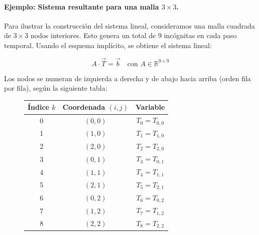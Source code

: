 \documentclass{article}
\begin{document}
\paragraph{Ejemplo: Sistema resultante para una malla $3 \times 3$.} Para ilustrar la construcción del sistema lineal, consideramos una malla cuadrada de $3 \times 3$ nodos interiores. Esto genera un total de $9$ incógnitas en cada paso temporal. Usando el esquema implícito, se obtiene el sistema lineal:

$$
A \cdot \vec{T} = \vec{b} \quad \text{con } A \in \mathbb{R}^{9 \times 9} 
$$

Los nodos se numeran de izquierda a derecha y de abajo hacia arriba (orden fila por fila), según la siguiente tabla:

\begin{figure}[H]
\centering
\begin{minipage}[c]{0.45\textwidth}
\centering
\begin{tabular}{|c|c|c|}
\hline
Índice $k$ & Coordenada $(i,j)$ & Variable \\
\hline
0 & $(0,0)$ & $T_0 = T_{0,0}$ \\
1 & $(1,0)$ & $T_1 = T_{1,0}$ \\
2 & $(2,0)$ & $T_2 = T_{2,0}$ \\
3 & $(0,1)$ & $T_3 = T_{0,1}$ \\
4 & $(1,1)$ & $T_4 = T_{1,1}$ \\
5 & $(2,1)$ & $T_5 = T_{2,1}$ \\
6 & $(0,2)$ & $T_6 = T_{0,2}$ \\
7 & $(1,2)$ & $T_7 = T_{1,2}$ \\
8 & $(2,2)$ & $T_8 = T_{2,2}$ \\
\hline
\end{tabular}
\end{minipage}
\hspace{0.5cm} %
\begin{minipage}[c]{0.5\textwidth}
\centering
{}
\vspace{0.2mm}
\end{minipage}
\end{figure}
\end{document}
